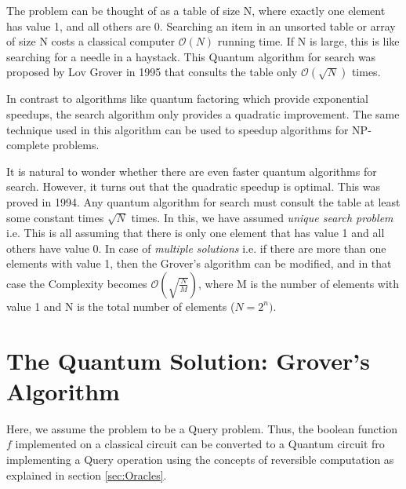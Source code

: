 \begin{importantnote}
    The problem can be thought of as a table of size N, where exactly one element has value 1, and all others are 0. Searching an item in an unsorted table or array of size N costs a classical computer $\mathcal{O}(N)$ running time. If N is large, this is like searching for a needle in a haystack. This Quantum algorithm for search was proposed by Lov Grover in 1995 that consults the table only $\mathcal{O}(\sqrt{N})$ times.

    In contrast to algorithms like quantum factoring which provide exponential speedups, the search algorithm only provides a quadratic improvement. The same technique used in this algorithm can be used to speedup algorithms for NP-complete problems.

    It is natural to wonder whether there are even faster quantum algorithms for search. However, it turns out that  the quadratic speedup is optimal. This was proved in 1994. Any quantum algorithm for search must consult the table at least some constant times $\sqrt{N}$ times. In this, we have assumed \textit{unique search problem} i.e. This is all assuming that there is only one element that has value 1 and all others have value 0. In case of \textit{multiple solutions} i.e. if there are more than one elements with value 1, then the Grover's algorithm can be modified, and in that case the Complexity becomes $\mathcal{O}(\sqrt{\frac{N}{M}})$, where M is the number of elements with value 1 and N is the total number of elements ($N=2^n)$.
\end{importantnote}
\section{The Quantum Solution: Grover's Algorithm}
Here, we assume the problem to be a Query problem. Thus, the boolean function $f$ implemented on a classical circuit can be converted to a Quantum circuit fro implementing a Query operation using the concepts of reversible computation as explained in section \ref{sec:Oracles}.
